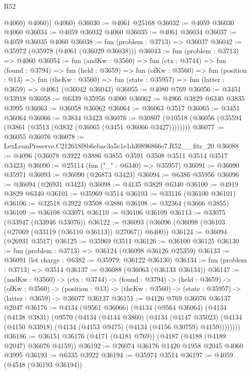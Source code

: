 \begin{lexlean}{R52}
\begin{coremodule}
            @4060)
          @4060))
      @4060)
@36030 := @4061 @25168
@36032 := @4059 @36030 @4060
@36034 := @4059 @36032 @4060
@36035 := @4061 @36034
@36037 := @4059 @36035 @4060
@36038 := fun (problem : @3713) => @36037
@36042 := @35972 (@35978 (@4061 (@36029 @36038)))
@36043 := fun (problem : @3713) => @4060
@36054 := fun (andKw : @3560) =>
  fun (ctx : @3744) =>
  fun (found : @3794) =>
  fun (held : @3659) =>
  fun (ofKw : @3560) =>
  fun (position : @13) =>
  fun (theKw : @3560) => fun (state : @35957) => fun (latter : @3659) => @4061 (@36042 @36043)
@36055 := @4080 @769
@36056 := @3451 @33918
@36058 := @6339 @35956 @4000
@36062 := @4966 @3829 @6340 @3835 @3995
@36063 := @36058 @36062
@36064 := @36063 @3517
@36065 := @3451 @36064
@36066 := @3834 @3423
@36076 := @30807 (@10518 (@36056 (@35594 (@3861 (@3513 (@3832 (@36065 (@3451 @36066 @3427))))))))
@36077 := @36055 @36076
@36078 := LexLeanPreserve.C212618f8b6ebac3a5c1e1dd0896866e7.R52.__fits_20
@36088 := @4096 (@36078 @3922 @3886 @3855 @3591 @3508 @3511 @3514 @3517 @3423)
@36090 := @25114 (fun ("_" : @6340) => @35957)
@36091 := @36090 @35971
@36093 := @36090 (@26873 @3423)
@36094 := @6386 @35956
@36096 := @36094 (@26931 @3423)
@36098 := @4135 @3829 @6340
@36100 := @4919 @3829 @6340
@36101 := @35969 @3514
@36103 := @33116 (@36100 @36101)
@36106 := @32518 @3922 @3508 @3886
@36108 := @32364 (@3666 @3855)
@36109 := @36108 @33071
@36110 := @36106 @36109
@36113 := @33075 (@33947 (@33946 @33076))
@36122 := @36093 (@36096 (@36098 (@36103 (@27069 (@33119 (@36110 @36113)) @27067)) @6400))
@36124 := @36094 (@26931 @3517)
@36125 := @35969 @3511
@36126 := @36100 @36125
@36130 := fun (problem : @3713) => @36124 (@36098 @36126 @25359)
@36133 := @36091 (let charge : @6382 := @35979; @36122 @36130)
@36134 := fun (problem : @3713) => @3514
@36137 := @36088 (@36063 (@36133 @36134))
@36147 := (andKw : @3560) ->
  (ctx : @3744) ->
  (found : @3794) ->
  (held : @3659) ->
  (ofKw : @3560) ->
  (position : @13) -> (theKw : @3560) -> (state : @35957) -> (latter : @3659) -> @36077 @36137
@36151 := @4126 @769 @36076 @36137 @2047
@36176 := @4134
    (@9561 @36066)
    (@4134
      (@9564 @36064)
      (@4134
        (@4138 @3831)
        (@9570
          (@4134
            (@4144 @3860)
            (@4134
              (@4147 @35023)
              (@4134 (@4150 @33918) (@4134 (@4153 @9475) (@4134 (@4156 @30759) @4159))))))))
@36186 := @36151 @36176 (@4171 (@4181 @769)) (@4187 (@4188 (@4189 @2047) @36076 @4159))
@36192 := @26074 @36176 @1420 @1958 @2045 @4060 @3995
@36193 := @6335 @3922
@36194 := @35974 @3514
@36197 := @4059 (@4548 (@36193 @36194))

\end{coremodule}
\end{lexlean}
